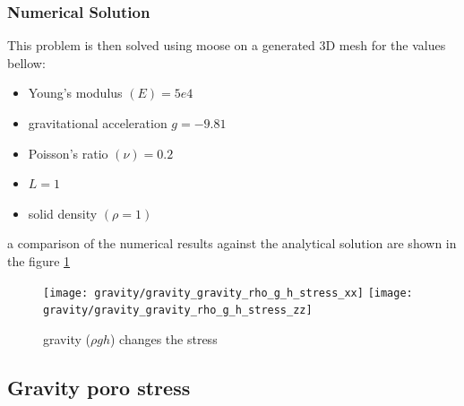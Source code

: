 \documentclass[]{scrreprt}
\begin{document}
\subsubsection{Numerical Solution}
This problem is then solved using moose on a generated 3D mesh for the values bellow:
\begin{itemize}
\item Young's modulus $(E)=5e4$\
\item gravitational acceleration $g =-9.81$\
\item Poisson's ratio $(\nu) =0.2$\
\item $L=1$\
\item  solid density $(\rho=1)$\
\end{itemize}
 a comparison of the numerical results against the analytical solution are shown in the figure \ref{fig:gravity_rho_g_h}
 \begin{figure}
  \centering
  \texttt{[image: gravity/gravity\_gravity\_rho\_g\_h\_stress\_xx]}
  \texttt{[image: gravity/gravity\_gravity\_rho\_g\_h\_stress\_zz]}\\
  \caption{gravity ($\rho g h$) changes the stress  }
  \label{fig:gravity_rho_g_h}
\end{figure}

\subsection{Gravity poro stress}
\label{subsec:gravity_poro_stress}
\end{document}
